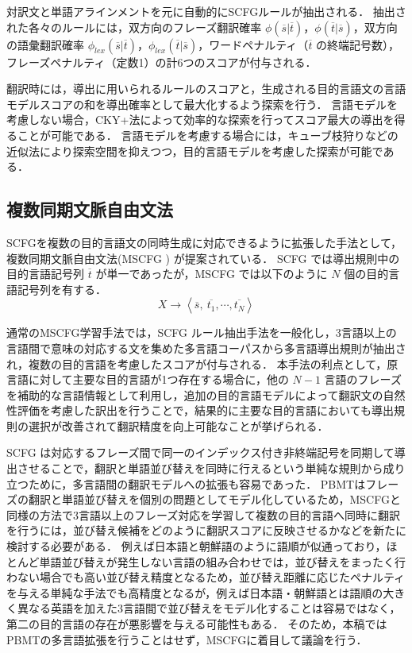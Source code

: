 \documentclass[japanese]{jnlp_1.4}
\begin{document}
対訳文と単語アラインメントを元に自動的にSCFGルールが抽出される．
抽出された各々のルールには，双方向のフレーズ翻訳確率 $\phi(\overline{s}|\overline{t})$，$\phi(\overline{t}|\overline{s})$，双方向の語彙翻訳確率 $\phi_{lex}(\overline{s}|\overline{t})$，$\phi_{lex}(\overline{t}|\overline{s})$，ワードペナルティ（$\overline{t}$ の終端記号数），フレーズペナルティ（定数1）の計6つのスコアが付与される．

翻訳時には，導出に用いられるルールのスコアと，生成される目的言語文の言語モデルスコアの和を導出確率として最大化するよう探索を行う．
言語モデルを考慮しない場合，CKY+法\cite{chappelier98}によって効率的な探索を行ってスコア最大の導出を得ることが可能である．
言語モデルを考慮する場合には，キューブ枝狩り\cite{chiang07}などの近似法により探索空間を抑えつつ，目的言語モデルを考慮した探索が可能である．


\subsection{複数同期文脈自由文法}
\label{sec:mscfg}

SCFGを複数の目的言語文の同時生成に対応できるように拡張した手法として，複数同期文脈自由文法(MSCFG \cite{neubig15naacl}) が提案されている．
SCFG では導出規則中の目的言語記号列 $\overline{t}$ が単一であったが，MSCFG では以下のように $N$ 個の目的言語記号列を有する．
\begin{equation}
X \longrightarrow \left<\overline{s},~ \overline{t_1}, \cdots, \overline{t_N}\right>
\end{equation}

通常のMSCFG学習手法では，SCFG ルール抽出手法を一般化し，3言語以上の言語間で意味の対応する文を集めた多言語コーパスから多言語導出規則が抽出され，複数の目的言語を考慮したスコアが付与される．
本手法の利点として，原言語に対して主要な目的言語が1つ存在する場合に，他の $N-1$ 言語のフレーズを補助的な言語情報として利用し，追加の目的言語モデルによって翻訳文の自然性評価を考慮した訳出を行うことで，結果的に主要な目的言語においても導出規則の選択が改善されて翻訳精度を向上可能なことが挙げられる．

SCFG は対応するフレーズ間で同一のインデックス付き非終端記号を同期して導出させることで，翻訳と単語並び替えを同時に行えるという単純な規則から成り立つために，多言語間の翻訳モデルへの拡張も容易であった．
PBMTはフレーズの翻訳と単語並び替えを個別の問題としてモデル化しているため，MSCFGと同様の方法で3言語以上のフレーズ対応を学習して複数の目的言語へ同時に翻訳を行うには，並び替え候補をどのように翻訳スコアに反映させるかなどを新たに検討する必要がある．
例えば日本語と朝鮮語のように語順が似通っており，ほとんど単語並び替えが発生しない言語の組み合わせでは，並び替えをまったく行わない場合でも高い並び替え精度となるため，並び替え距離に応じたペナルティを与える単純な手法でも高精度となるが，例えば日本語・朝鮮語とは語順の大きく異なる英語を加えた3言語間で並び替えをモデル化することは容易ではなく，第二の目的言語の存在が悪影響を与える可能性もある．
そのため，本稿ではPBMTの多言語拡張を行うことはせず，MSCFGに着目して議論を行う．
\end{document}

